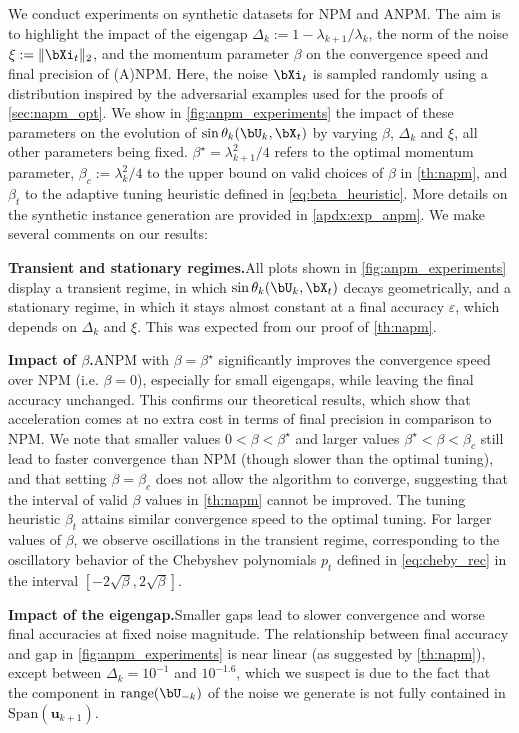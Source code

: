 \documentclass{article}
\theoremstyle{plain}
\theoremstyle{definition}
\theoremstyle{remark}
\begin{document}
We conduct experiments on synthetic datasets for NPM and ANPM. The aim is to highlight the impact of the eigengap $\Delta_k := 1 - \lambda_{k+1}/\lambda_k$, the norm of the noise $\xi := \Vert\bXi_t\Vert_2$, and the momentum parameter $\beta$ on the convergence speed and final precision of (A)NPM. Here, the noise $\bXi_t$ is sampled randomly using a distribution inspired by the adversarial examples used for the proofs of \cref{sec:napm_opt}. We show in \cref{fig:anpm_experiments} the impact of these parameters on the evolution of $\sin\theta_k(\bU_k, \bX_t)$ by varying $\beta$, $\Delta_k$ and $\xi$, all other parameters being fixed. $\beta^\star = \lambda_{k+1}^2/4$ refers to the optimal momentum parameter, $\beta_c := \lambda_k^2/4$ to the upper bound on valid choices of $\beta$ in \cref{th:napm}, and $\beta_t$ to the adaptive tuning heuristic defined in \eqref{eq:beta_heuristic}. More details on the synthetic instance generation are provided in \cref{apdx:exp_anpm}. We make several comments on our results:

\textbf{Transient and stationary regimes.}\quad All plots shown in \cref{fig:anpm_experiments} display a transient regime, in which $\sin\theta_k(\bU_k,\bX_t)$ decays geometrically, and a stationary regime, in which it stays almost constant at a final accuracy $\varepsilon$, which depends on $\Delta_k$ and $\xi$. This was expected from our proof of \cref{th:napm}.

\textbf{Impact of $\beta$.}\quad ANPM with $\beta = \beta^\star$ significantly improves the convergence speed over NPM (i.e. $\beta = 0$), especially for small eigengaps, while leaving the final accuracy unchanged. This confirms our theoretical results, which show that acceleration comes at no extra cost in terms of final precision in comparison to NPM. We note that smaller values $0<\beta<\beta^\star$ and larger values $\beta^\star < \beta < \beta_c$ still lead to faster convergence than NPM (though slower than the optimal tuning), and that setting $\beta = \beta_c$ does not allow the algorithm to converge, suggesting that the interval of valid $\beta$ values in \cref{th:napm} cannot be improved. The tuning heuristic $\beta_t$ attains similar convergence speed to the optimal tuning. For larger values of $\beta$, we observe oscillations in the transient regime, corresponding to the oscillatory behavior of the Chebyshev polynomials $p_t$ defined in \eqref{eq:cheby_rec} in the interval $[-2\sqrt{\beta}, 2\sqrt{\beta}]$.

\textbf{Impact of the eigengap.}\quad Smaller gaps lead to slower convergence and worse final accuracies at fixed noise magnitude. The relationship between final accuracy and gap in \cref{fig:anpm_experiments} is near linear (as suggested by \cref{th:napm}), except between $\Delta_k = 10^{-1}$ and $10^{-1.6}$, which we suspect is due to the fact that the component in $\mathrm{range}(\bU_{-k})$ of the noise we generate is not fully contained in $\mathrm{Span}(\bm{u}_{k+1})$.
\end{document}
